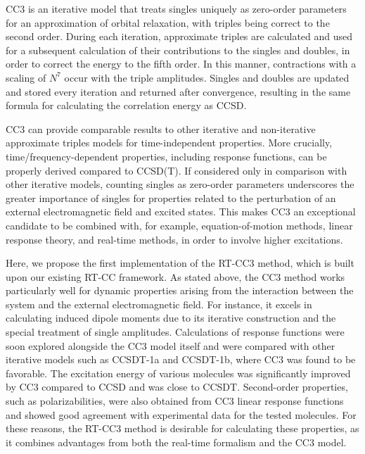 CC3 is an iterative model that treats singles uniquely as zero-order parameters for an approximation of orbital relaxation, with triples being correct to the second order. During each iteration, approximate triples are calculated and used for a subsequent calculation of their contributions to the singles and doubles, in order to correct the energy to the fifth order. In this manner, contractions with a scaling of $N^{7}$ occur with the triple amplitudes. Singles and doubles are updated and stored every iteration and returned after convergence, resulting in the same formula for calculating the correlation energy as CCSD.

CC3 can provide comparable results to other iterative and non-iterative approximate triples models for time-independent properties.\cite{Koch1997} More crucially, time/frequency-dependent properties, including response functions, can be properly derived compared to CCSD(T).\cite{Koch1997, Christiansen1995CC3} If considered only in comparison with other iterative models, counting singles as zero-order parameters underscores the greater importance of singles for properties related to the perturbation of an external electromagnetic field and excited states. This makes CC3 an exceptional candidate to be combined with, for example, equation-of-motion methods,\cite{Stanton1993} linear response theory,\cite{Olsen1985, Sekino1984} and real-time methods,\cite{Goings2018, Li2020} in order to involve higher excitations.

Here, we propose the first implementation of the RT-CC3 method, which is built upon our existing RT-CC framework. As stated above, the CC3 method works particularly well for dynamic properties arising from the interaction between the system and the external electromagnetic field. For instance, it excels in calculating induced dipole moments due to its iterative construction and the special treatment of single amplitudes.\cite{Hald2002} Calculations of response functions were soon explored alongside the CC3 model itself and were compared with other iterative models such as CCSDT-1a and CCSDT-1b, where CC3 was found to be favorable.\cite{Christiansen1995CC3} The excitation energy of various molecules was significantly improved by CC3 compared to CCSD and was close to CCSDT. Second-order properties, such as polarizabilities, were also obtained from CC3 linear response functions and showed good agreement with experimental data for the tested molecules.\cite{Hald2003} For these reasons, the RT-CC3 method is desirable for calculating these properties, as it combines advantages from both the real-time formalism and the CC3 model.

